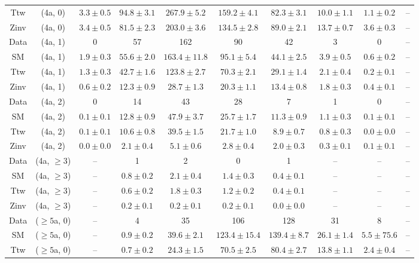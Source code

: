 \begin{table}[h!]
{\begin{tabular}{cccccccccc}
	Ttw & (4a, 0) & $3.3\pm 0.5$ & $94.8\pm 3.1$ & $267.9\pm 5.2$ & $159.2\pm 4.1$ & $82.3\pm 3.1$ & $10.0\pm 1.1$ & $1.1\pm 0.2$ & -- \\[0.5ex] 
	Zinv & (4a, 0) & $3.4\pm 0.5$ & $81.5\pm 2.3$ & $203.0\pm 3.6$ & $134.5\pm 2.8$ & $89.0\pm 2.1$ & $13.7\pm 0.7$ & $3.6\pm 0.3$ & -- \\[0.5ex] 
	Data & (4a, 1) & 0 & 57 & 162 & 90 & 42 & 3 & 0 & -- \\[0.5ex] 
	SM & (4a, 1) & $1.9\pm 0.3$ & $55.6\pm 2.0$ & $163.4\pm 11.8$ & $95.1\pm 5.4$ & $44.1\pm 2.5$ & $3.9\pm 0.5$ & $0.6\pm 0.2$ & -- \\[0.5ex] 
	Ttw & (4a, 1) & $1.3\pm 0.3$ & $42.7\pm 1.6$ & $123.8\pm 2.7$ & $70.3\pm 2.1$ & $29.1\pm 1.4$ & $2.1\pm 0.4$ & $0.2\pm 0.1$ & -- \\[0.5ex] 
	Zinv & (4a, 1) & $0.6\pm 0.2$ & $12.3\pm 0.9$ & $28.7\pm 1.3$ & $20.3\pm 1.1$ & $13.4\pm 0.8$ & $1.8\pm 0.3$ & $0.4\pm 0.1$ & -- \\[0.5ex] 
	Data & (4a, 2) & 0 & 14 & 43 & 28 & 7 & 1 & 0 & -- \\[0.5ex] 
	SM & (4a, 2) & $0.1\pm 0.1$ & $12.8\pm 0.9$ & $47.9\pm 3.7$ & $25.7\pm 1.7$ & $11.3\pm 0.9$ & $1.1\pm 0.3$ & $0.1\pm 0.1$ & -- \\[0.5ex] 
	Ttw & (4a, 2) & $0.1\pm 0.1$ & $10.6\pm 0.8$ & $39.5\pm 1.5$ & $21.7\pm 1.0$ & $8.9\pm 0.7$ & $0.8\pm 0.3$ & $0.0\pm 0.0$ & -- \\[0.5ex] 
	Zinv & (4a, 2) & $0.0\pm 0.0$ & $2.1\pm 0.4$ & $5.1\pm 0.6$ & $2.8\pm 0.4$ & $2.0\pm 0.3$ & $0.3\pm 0.1$ & $0.1\pm 0.1$ & -- \\[0.5ex] 
	Data & (4a, $\ge3$) & -- & 1 & 2 & 0 & 1 & -- & -- & -- \\[0.5ex] 
	SM & (4a, $\ge3$) & -- & $0.8\pm 0.2$ & $2.1\pm 0.4$ & $1.4\pm 0.3$ & $0.4\pm 0.1$ & -- & -- & -- \\[0.5ex] 
	Ttw & (4a, $\ge3$) & -- & $0.6\pm 0.2$ & $1.8\pm 0.3$ & $1.2\pm 0.2$ & $0.4\pm 0.1$ & -- & -- & -- \\[0.5ex] 
	Zinv & (4a, $\ge3$) & -- & $0.2\pm 0.1$ & $0.2\pm 0.1$ & $0.2\pm 0.1$ & $0.0\pm 0.0$ & -- & -- & -- \\[0.5ex] 
	Data & ($\ge5$a, 0) & -- & 4 & 35 & 106 & 128 & 31 & 8 & -- \\[0.5ex] 
	SM & ($\ge5$a, 0) & -- & $0.9\pm 0.2$ & $39.6\pm 2.1$ & $123.4\pm 15.4$ & $139.4\pm 8.7$ & $26.1\pm 1.4$ & $5.5\pm 75.6$ & -- \\[0.5ex] 
	Ttw & ($\ge5$a, 0) & -- & $0.7\pm 0.2$ & $24.3\pm 1.5$ & $70.5\pm 2.5$ & $80.4\pm 2.7$ & $13.8\pm 1.1$ & $2.4\pm 0.4$ & -- \\[0.5ex] 

\end{tabular}}
\end{table}
